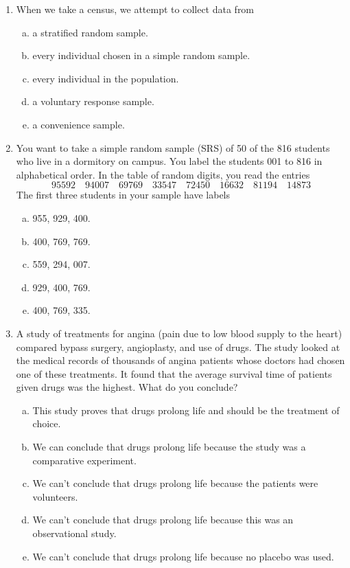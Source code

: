 \documentclass[a4paper,12pt,twoside]{book}
\begin{document}
\begin{enumerate}
\item When we take a census, we attempt to collect data from
    \begin{enumerate}[(a)]
        \item  a stratified random sample.
        \item every individual chosen in a simple random sample.
        \item every individual in the population.
        \item  a voluntary response sample.
        \item  a convenience sample.
    \end{enumerate}     
 
 \item  You want to take a simple random sample (SRS) of 50 of the 816 students who live in a dormitory on campus. You label the students 001 to 816 in alphabetical order. In the table of random digits, you read the entries
 $$95592\quad 94007\quad 69769\quad 33547 \quad 72450 \quad16632\quad 81194\quad 14873$$
 The first three students in your sample have labels
 \begin{multicols}{2}
 \begin{enumerate}[(a)]
     \item 955, 929, 400.
     \item 400, 769, 769.
     \item 559, 294, 007. 
     \item 929, 400, 769.
     \item 400, 769, 335.
 \end{enumerate}
 \end{multicols}
 
 \item A study of treatments for angina (pain due to low blood supply to the heart) compared bypass surgery, angioplasty, and use of drugs. The study looked at the medical records of thousands of angina patients whose doctors had chosen one of these treatments. It found that the average survival time of patients given drugs was the highest. What do you conclude? 
 \begin{enumerate}[(a)]
     \item This study proves that drugs prolong life and should be the treatment of choice.
     \item  We can conclude that drugs prolong life because the study was a comparative experiment.
     \item We can’t conclude that drugs prolong life because the patients were volunteers.
     \item We can’t conclude that drugs prolong life because this was an observational study.
     \item We can’t conclude that drugs prolong life because no placebo was used.
 \end{enumerate}
 

\end{enumerate}
\end{document}
